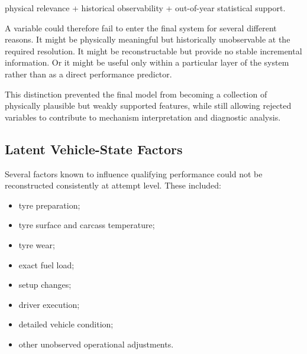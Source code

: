 physical relevance + historical observability + out-of-year statistical support.

A variable could therefore fail to enter the final system for several different reasons. It might be physically meaningful but historically unobservable at the required resolution. It might be reconstructable but provide no stable incremental information. Or it might be useful only within a particular layer of the system rather than as a direct performance predictor.

This distinction prevented the final model from becoming a collection of physically plausible but weakly supported features, while still allowing rejected variables to contribute to mechanism interpretation and diagnostic analysis.

\subsection{Latent Vehicle-State Factors}
Several factors known to influence qualifying performance could not be reconstructed consistently at attempt level. These included:

\begin{itemize}
\item tyre preparation;
\item tyre surface and carcass temperature;
\item tyre wear;
\item exact fuel load;
\item setup changes;
\item driver execution;
\item detailed vehicle condition;
\item other unobserved operational adjustments.
\end{itemize}


